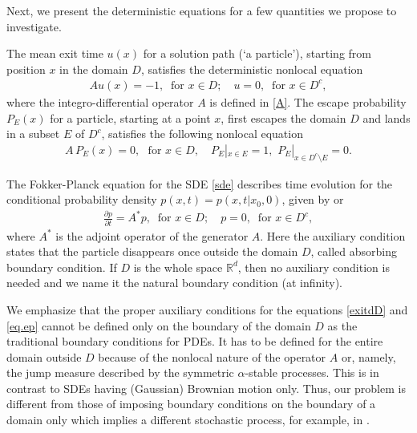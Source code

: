\documentclass[11pt]{article}
\begin{document}
Next, we present the deterministic equations for a few quantities
we propose to investigate.

The mean   exit time $u(x)$  for a solution path (`a particle'), starting from   position $x$ in the domain $D$,  satisfies the deterministic nonlocal equation
\cite{Apple,Sato-99,Naeh,Schuss,Oksendal3}
\begin{eqnarray}
 A u(x) = -1, \;\; \text{for } x\in D; \quad u =0, \;\; \text{for } x \in D^c,
\label{exitdD}
\end{eqnarray}
where the integro-differential operator $A$ is defined in \eqref{A}.
The escape probability $P_E(x)$ for a particle, starting at a point $x$,
first escapes the domain $D$ and lands in a subset $E$ of $D^c$,
satisfies the following nonlocal equation \cite{QiaoKan}
\begin{eqnarray}
 A\, P_E(x)=0, \,\, \text{ for } x \in D, \quad
 P_E|_{x \in E}=1, \,\, P_E|_{x \in D^c\setminus E}=0. \label{eq.ep}
\end{eqnarray}

The Fokker-Planck equation for the SDE \eqref{sde} describes time evolution
 for the   conditional probability
density $p(x,t) = p(x, t|x_0, 0)$,   given by \cite[Ch. 7]{DuanBook2015} or \cite{Apple,Schertzer,wu,wu2}
\begin{eqnarray}
 \frac{\partial p}{\partial t} = A^* p, \;\;
   \text{for } x\in D;
  \quad p =0, \;\; \text{for } x \in D^c,
\label{fpe}
\end{eqnarray}
where $A^*$ is the adjoint operator of the generator $A$.
Here the auxiliary condition states that the particle disappears once outside
the domain $D$, called absorbing boundary condition. If $D$ is the whole space
$\mathbb{R}^d$, then no auxiliary condition is needed and we name it
the natural boundary condition (at infinity).

We emphasize that the proper auxiliary conditions
for the equations \eqref{exitdD} and \eqref{eq.ep} cannot be defined
only on the boundary of the domain $D$ as the traditional boundary conditions
for PDEs. It has to be defined
for the entire domain outside $D$ because of the nonlocal nature of
the operator $A$ or, namely, the jump measure
described by the symmetric $\alpha$-stable processes.
This is in contrast to SDEs having (Gaussian) Brownian motion  only.
Thus, our problem is different from those of imposing
boundary conditions on the boundary of a domain only
which implies a different stochastic process,
for example, in
\cite{ervin2007numerical,li2012finite,meerschaert2004finite,bueno2012fourier,yang2010numerical}.
\end{document}
